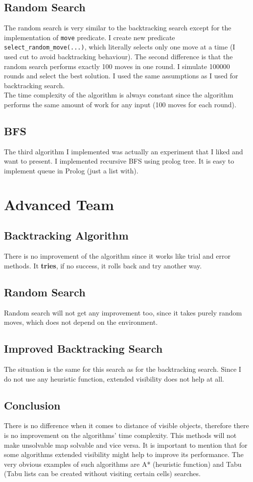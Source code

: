 \documentclass{article}
\begin{document}
\subsection{Random Search}
The random search is very similar to the backtracking search except for the implementation of \texttt{move} predicate. I create new predicate \texttt{select\_random\_move(...)}, which literally selects only one move at a time (I used cut to avoid backtracking behaviour). The second difference is that the random search performs exactly 100 moves in one round. I simulate 100000 rounds and select the best solution. I used the same assumptions as I used for backtracking search.\\
The time complexity of the algorithm is always constant since the algorithm performs the same amount of work for any input (100 moves for each round). 

\subsection{BFS}
The third algorithm I implemented was actually an experiment that I liked and want to present. I implemented recursive BFS using prolog tree. It is easy to implement queue in Prolog (just a list with).

\section{Advanced Team}
\subsection{Backtracking Algorithm}
There is no improvement of the algorithm since it works like trial and error methods. It \textbf{tries}, if no success, it rolls back and try another way. 
\subsection{Random Search}
Random search will not get any improvement too, since it takes purely random moves, which does not depend on the environment.
\subsection{Improved Backtracking Search}
The situation is the same for this search as for the backtracking search. Since I do not use any heuristic function, extended visibility does not help at all.
\subsection{Conclusion}
There is no difference when it comes to distance of visible objects, therefore there is no improvement on the algorithms' time complexity. This methods will not make unsolvable map solvable and vice versa.
It is important to mention that for some algorithms extended visibility might help to improve its performance. The very obvious examples of such algorithms are A* (heuristic function) and Tabu (Tabu lists can be created without visiting certain cells) searches.
\end{document}
